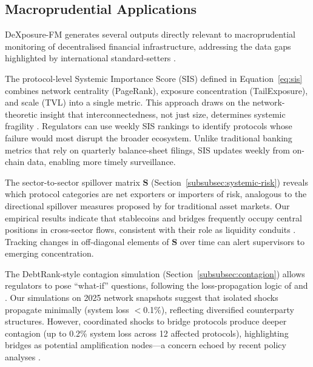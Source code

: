 \documentclass[preprint,12pt]{elsarticle}
\renewcommand{\paragraph}[1]{}
\begin{document}
\subsection{Macroprudential Applications}
\label{subsec:macro-applications}

DeXposure-FM generates several outputs directly relevant to macroprudential monitoring of decentralised financial infrastructure, addressing the data gaps highlighted by international standard-setters \citep{FSB2023,IOSCO2023DeFi}.

\paragraph{Systemic importance ranking.}
The protocol-level Systemic Importance Score (SIS) defined in Equation~\eqref{eq:sis} combines network centrality (PageRank), exposure concentration (TailExposure), and scale (TVL) into a single metric. This approach draws on the network-theoretic insight that interconnectedness, not just size, determines systemic fragility \citep{Acemoglu2015SystemicRisk,GlassermanYoung2016Contagion}. Regulators can use weekly SIS rankings to identify protocols whose failure would most disrupt the broader ecosystem. Unlike traditional banking metrics that rely on quarterly balance-sheet filings, SIS updates weekly from on-chain data, enabling more timely surveillance.

\paragraph{Sector spillover monitoring.}
The sector-to-sector spillover matrix $\mathbf{S}$ (Section~\ref{subsubsec:systemic-risk}) reveals which protocol categories are net exporters or importers of risk, analogous to the directional spillover measures proposed by \cite{DieboldYilmaz2012} for traditional asset markets. Our empirical results indicate that stablecoins and bridges frequently occupy central positions in cross-sector flows, consistent with their role as liquidity conduits \citep{KosseEtAl2023Stablecoin,ESRB2025}. Tracking changes in off-diagonal elements of $\mathbf{S}$ over time can alert supervisors to emerging concentration.

\paragraph{Stress testing and contagion assessment.}
The DebtRank-style contagion simulation (Section~\ref{subsubsec:contagion}) allows regulators to pose ``what-if'' questions, following the loss-propagation logic of \cite{EisenbergNoe2001} and \cite{BattistonEtAl2012DebtRank}. Our simulations on 2025 network snapshots suggest that isolated shocks propagate minimally (system loss $<$0.1\%), reflecting diversified counterparty structures. However, coordinated shocks to bridge protocols produce deeper contagion (up to 0.2\% system loss across 12 affected protocols), highlighting bridges as potential amplification nodes---a concern echoed by recent policy analyses \citep{Aufiero2025}.
\end{document}
